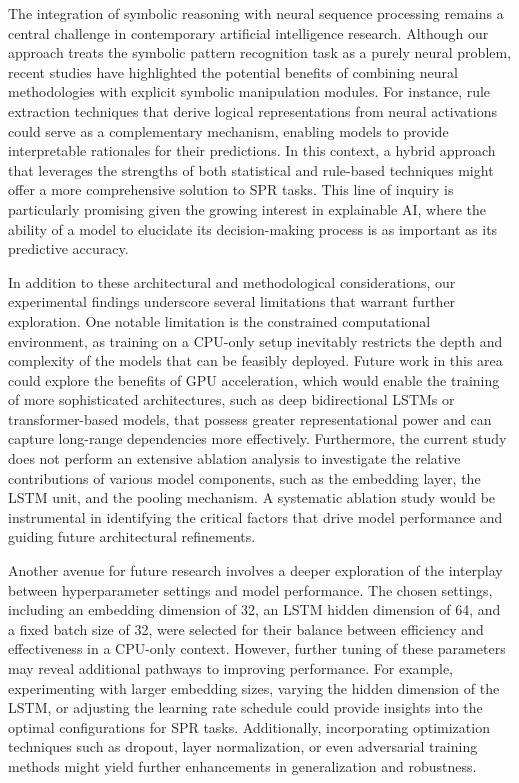 \documentclass{article}
\begin{document}
The integration of symbolic reasoning with neural sequence processing remains a central challenge in contemporary artificial intelligence research. Although our approach treats the symbolic pattern recognition task as a purely neural problem, recent studies have highlighted the potential benefits of combining neural methodologies with explicit symbolic manipulation modules. For instance, rule extraction techniques that derive logical representations from neural activations could serve as a complementary mechanism, enabling models to provide interpretable rationales for their predictions. In this context, a hybrid approach that leverages the strengths of both statistical and rule-based techniques might offer a more comprehensive solution to SPR tasks. This line of inquiry is particularly promising given the growing interest in explainable AI, where the ability of a model to elucidate its decision-making process is as important as its predictive accuracy.

In addition to these architectural and methodological considerations, our experimental findings underscore several limitations that warrant further exploration. One notable limitation is the constrained computational environment, as training on a CPU-only setup inevitably restricts the depth and complexity of the models that can be feasibly deployed. Future work in this area could explore the benefits of GPU acceleration, which would enable the training of more sophisticated architectures, such as deep bidirectional LSTMs or transformer-based models, that possess greater representational power and can capture long-range dependencies more effectively. Furthermore, the current study does not perform an extensive ablation analysis to investigate the relative contributions of various model components, such as the embedding layer, the LSTM unit, and the pooling mechanism. A systematic ablation study would be instrumental in identifying the critical factors that drive model performance and guiding future architectural refinements.

Another avenue for future research involves a deeper exploration of the interplay between hyperparameter settings and model performance. The chosen settings, including an embedding dimension of 32, an LSTM hidden dimension of 64, and a fixed batch size of 32, were selected for their balance between efficiency and effectiveness in a CPU-only context. However, further tuning of these parameters may reveal additional pathways to improving performance. For example, experimenting with larger embedding sizes, varying the hidden dimension of the LSTM, or adjusting the learning rate schedule could provide insights into the optimal configurations for SPR tasks. Additionally, incorporating optimization techniques such as dropout, layer normalization, or even adversarial training methods might yield further enhancements in generalization and robustness.
\end{document}
